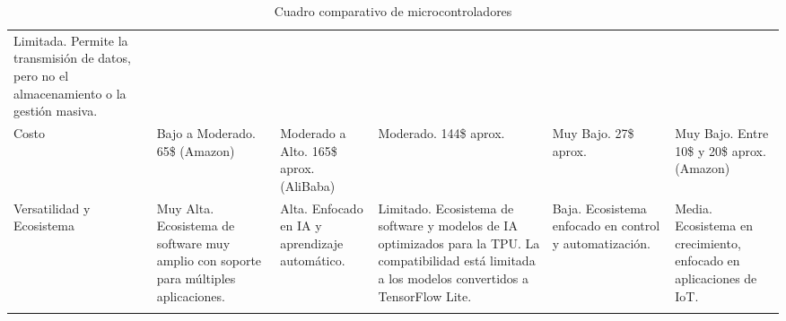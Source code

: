 {\begin{longtable}[c]{p{2.2cm} p{2.4cm} p{2.4cm} p{2.4cm} p{2.4cm} p{2.4cm}}
    Limitada. Permite la transmisión de datos, pero no el almacenamiento o la gestión masiva.                                                                \\
    \addlinespace
    Costo                                                                                                                                                  &
    Bajo a Moderado. 65\$ (Amazon)                                                                                                                         &
    Moderado a Alto. 165\$ aprox. (AliBaba)                                                                                                                &
    Moderado. 144\$ aprox.                                                                                                                                 &
    Muy Bajo. 27\$ aprox.                                                                                                                                  &
    Muy Bajo. Entre 10\$ y 20\$ aprox. (Amazon)
    \\
    \addlinespace
    Versatilidad y Ecosistema                                                                                                                              &
    Muy Alta. Ecosistema de software muy amplio con soporte para múltiples aplicaciones.                                                                   &
    Alta. Enfocado en IA y aprendizaje automático.                                                                                                         &
    Limitado. Ecosistema de software y modelos de IA optimizados para la TPU. La compatibilidad está limitada a los modelos convertidos a TensorFlow Lite. &
    Baja. Ecosistema enfocado en control y automatización.                                                                                                 &
    Media. Ecosistema en crecimiento, enfocado en aplicaciones de IoT.                                                                                       \\
    \bottomrule
    \addlinespace

    \caption{Cuadro comparativo de microcontroladores}
    \label{tab:cuadro_comparativo_microcontroladores}
  \end{longtable}
}
